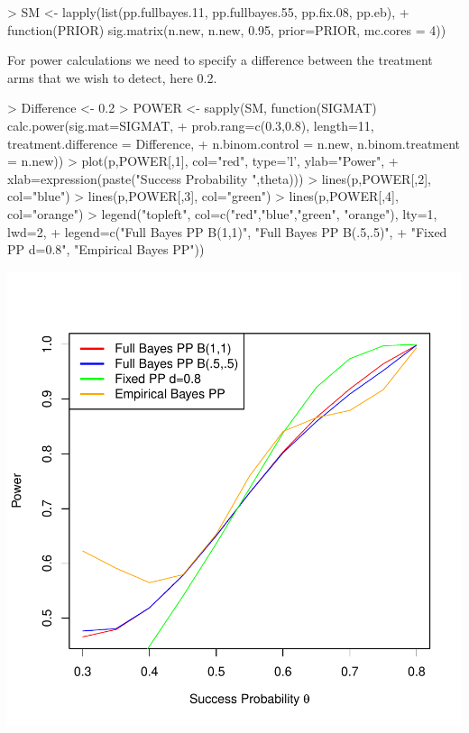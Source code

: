 \documentclass{article}
\begin{document}
\begin{Schunk}
\begin{Sinput}
> SM <- lapply(list(pp.fullbayes.11, pp.fullbayes.55, pp.fix.08, pp.eb),
+        function(PRIOR) sig.matrix(n.new, n.new, 0.95, prior=PRIOR, mc.cores = 4))
\end{Sinput}
\end{Schunk}
For power calculations we need to specify a difference between the treatment arms that we wish to detect, here 0.2.
\begin{Schunk}
\begin{Sinput}
> Difference <- 0.2
> POWER <- sapply(SM, function(SIGMAT) calc.power(sig.mat=SIGMAT, 
+       prob.rang=c(0.3,0.8), length=11, treatment.difference = Difference,
+       n.binom.control = n.new, n.binom.treatment = n.new))
> plot(p,POWER[,1],  col="red", type='l', ylab="Power",
+      xlab=expression(paste("Success Probability ",theta)))
> lines(p,POWER[,2],  col="blue")
> lines(p,POWER[,3],  col="green")
> lines(p,POWER[,4],  col="orange")
> legend("topleft", col=c("red","blue","green", "orange"), lty=1, lwd=2,
+        legend=c("Full Bayes PP B(1,1)", "Full Bayes PP B(.5,.5)",
+                 "Fixed PP d=0.8", "Empirical Bayes PP"))
\end{Sinput}
\end{Schunk}
\includegraphics{Binomial-Power}
\end{document}
